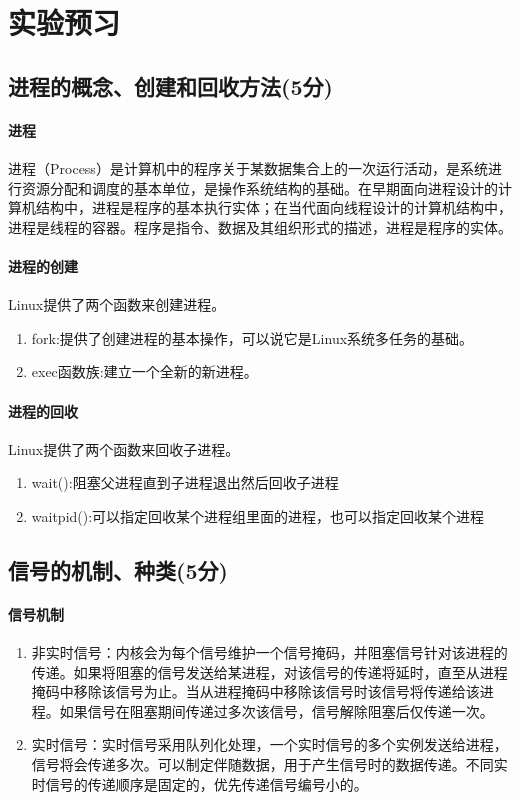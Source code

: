 \section{实验预习}
\subsection{进程的概念、创建和回收方法(5分)}

\paragraph{进程}进程（Process）是计算机中的程序关于某数据集合上的一次运行活动，是系统进行资源分配和调度的基本单位，是操作系统结构的基础。在早期面向进程设计的计算机结构中，进程是程序的基本执行实体；在当代面向线程设计的计算机结构中，进程是线程的容器。程序是指令、数据及其组织形式的描述，进程是程序的实体。

\paragraph{进程的创建}Linux提供了两个函数来创建进程。

\begin{enumerate}
    \item fork:提供了创建进程的基本操作，可以说它是Linux系统多任务的基础。
    \item exec函数族:建立一个全新的新进程。
\end{enumerate}

\paragraph{进程的回收}Linux提供了两个函数来回收子进程。

\begin{enumerate}
    \item wait():阻塞父进程直到子进程退出然后回收子进程
    \item waitpid():可以指定回收某个进程组里面的进程，也可以指定回收某个进程
\end{enumerate}

\subsection{信号的机制、种类(5分)}
\paragraph{信号机制}

\begin{enumerate}
\item 非实时信号：内核会为每个信号维护一个信号掩码，并阻塞信号针对该进程的传递。如果将阻塞的信号发送给某进程，对该信号的传递将延时，直至从进程掩码中移除该信号为止。当从进程掩码中移除该信号时该信号将传递给该进程。如果信号在阻塞期间传递过多次该信号，信号解除阻塞后仅传递一次。
\item 实时信号：实时信号采用队列化处理，一个实时信号的多个实例发送给进程，信号将会传递多次。可以制定伴随数据，用于产生信号时的数据传递。不同实时信号的传递顺序是固定的，优先传递信号编号小的。
\end{enumerate}

